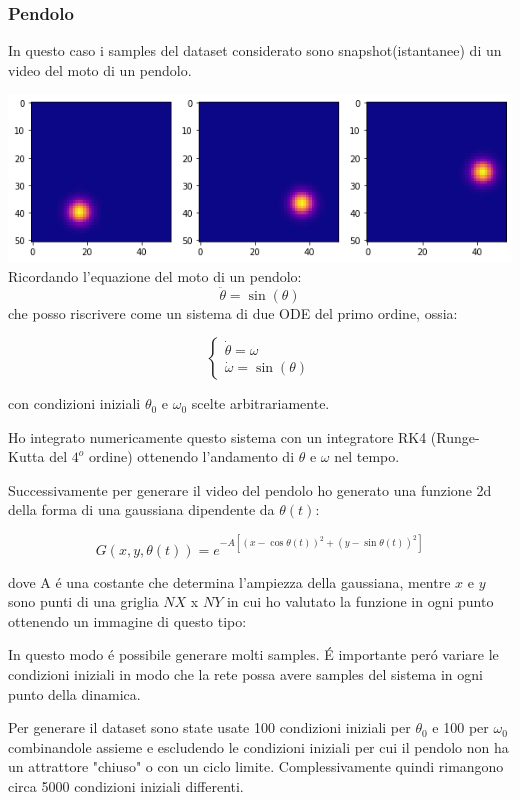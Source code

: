 \documentclass[11pt]{article}
\begin{document}
\subsubsection{Pendolo}
In questo caso i samples del dataset considerato sono snapshot(istantanee) di un video del moto di un pendolo.

\includegraphics[width=\textwidth]{pendulum_motion}
Ricordando l'equazione del moto di un pendolo:
$$ \ddot{\theta} = \sin(\theta) $$
che posso riscrivere come un sistema di due ODE del primo ordine, ossia:

$$
\begin{cases} 
\dot{\theta} = \omega \\ 
\dot{\omega} = \sin(\theta)
\end{cases}
$$

con condizioni iniziali $\theta_0$ e $\omega_0$ scelte arbitrariamente.

Ho integrato numericamente questo sistema con un integratore RK4 (Runge-Kutta del $4^o$ ordine) ottenendo l'andamento di $\theta$ e $\omega$ nel tempo.

Successivamente per generare il video del pendolo ho generato una funzione 2d della forma di una gaussiana dipendente da $\theta(t)$:


$$G(x,y,\theta(t)) = e^{-A[(x - \cos{\theta(t)})^2 + (y - \sin{\theta(t)})^2]}$$

dove A é una costante che determina l'ampiezza della gaussiana, mentre $x$ e $y$ sono punti di una griglia $NX$ x $NY$ in cui ho valutato la funzione in ogni punto ottenendo un immagine di questo tipo:

In questo modo é possibile generare molti samples.
É importante peró variare le condizioni iniziali in modo che la rete possa avere samples del sistema in ogni punto della dinamica.

Per generare il dataset sono state usate 100 condizioni iniziali per $\theta_0$ e 100 per $\omega_0$ combinandole assieme e escludendo le condizioni iniziali per cui il pendolo non ha un attrattore "chiuso" o con un ciclo limite. Complessivamente quindi rimangono circa 5000 condizioni iniziali differenti.
\end{document}
